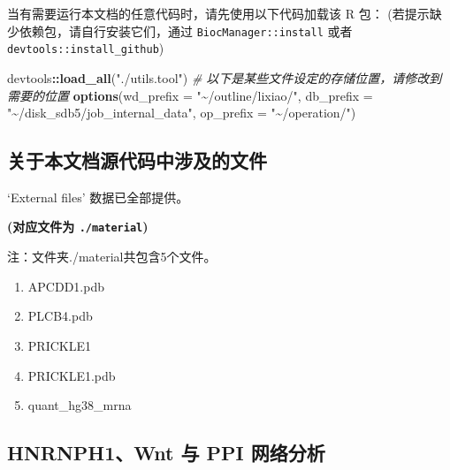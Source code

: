 \documentclass[
]{article}
\newenvironment{Shaded}{\begin{snugshade}}{\end{snugshade}}
\newcommand{\CommentTok}[1]{\textcolor[rgb]{0.56,0.35,0.01}{\textit{#1}}}
\newcommand{\DataTypeTok}[1]{\textcolor[rgb]{0.13,0.29,0.53}{#1}}
\newcommand{\KeywordTok}[1]{\textcolor[rgb]{0.13,0.29,0.53}{\textbf{#1}}}
\newcommand{\NormalTok}[1]{#1}
\newcommand{\OperatorTok}[1]{\textcolor[rgb]{0.81,0.36,0.00}{\textbf{#1}}}
\newcommand{\StringTok}[1]{\textcolor[rgb]{0.31,0.60,0.02}{#1}}
\providecommand{\tightlist}{%
  \setlength{\itemsep}{0pt}\setlength{\parskip}{0pt}}
\begin{document}
当有需要运行本文档的任意代码时，请先使用以下代码加载该 R 包：
(若提示缺少依赖包，请自行安装它们，通过 \texttt{BiocManager::install} 或者 \texttt{devtools::install\_github})

\begin{Shaded}
\begin{Highlighting}[]
\NormalTok{devtools}\OperatorTok{::}\KeywordTok{load\_all}\NormalTok{(}\StringTok{"./utils.tool"}\NormalTok{)}
\CommentTok{\# 以下是某些文件设定的存储位置，请修改到需要的位置}
\KeywordTok{options}\NormalTok{(}\DataTypeTok{wd\_prefix =} \StringTok{"\textasciitilde{}/outline/lixiao/"}\NormalTok{,}
  \DataTypeTok{db\_prefix =} \StringTok{"\textasciitilde{}/disk\_sdb5/job\_internal\_data"}\NormalTok{,}
  \DataTypeTok{op\_prefix =} \StringTok{"\textasciitilde{}/operation/"}\NormalTok{)}
\end{Highlighting}
\end{Shaded}

\hypertarget{ux5173ux4e8eux672cux6587ux6863ux6e90ux4ee3ux7801ux4e2dux6d89ux53caux7684ux6587ux4ef6}{%
\subsection{关于本文档源代码中涉及的文件}\label{ux5173ux4e8eux672cux6587ux6863ux6e90ux4ee3ux7801ux4e2dux6d89ux53caux7684ux6587ux4ef6}}

`External files' 数据已全部提供。

\textbf{(对应文件为 \texttt{./material})}

\begin{center}\begin{tcolorbox}[colback=gray!10, colframe=gray!50, width=0.9\linewidth, arc=1mm, boxrule=0.5pt]注：文件夹./material共包含5个文件。

\begin{enumerate}\tightlist
\item APCDD1.pdb
\item PLCB4.pdb
\item PRICKLE1
\item PRICKLE1.pdb
\item quant\_hg38\_mrna
\end{enumerate}\end{tcolorbox}
\end{center}

\hypertarget{hnrnph1wnt-ux4e0e-ppi-ux7f51ux7edcux5206ux6790-1}{%
\subsection{HNRNPH1、Wnt 与 PPI 网络分析}\label{hnrnph1wnt-ux4e0e-ppi-ux7f51ux7edcux5206ux6790-1}}
\end{document}
